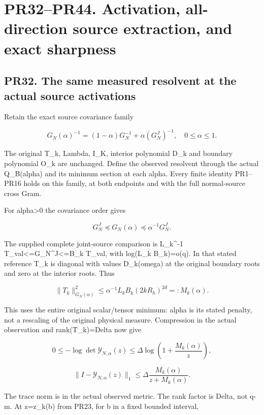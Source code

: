 \documentclass[11pt]{article}
\begin{document}
\section{PR32--PR44. Activation, all-direction source extraction, and exact sharpness}\label{pr32pr44.-activation-all-direction-source-extraction-and-exact-sharpness}

\subsection{PR32. The same measured resolvent at the actual source activations}\label{pr32.-the-same-measured-resolvent-at-the-actual-source-activations}

Retain the exact source covariance family

\[
G_N(\alpha)^{-1}=(1-\alpha)G_N^{-1}+\alpha(G_N^J)^{-1},\quad0\le\alpha\le1.
\]

The original T\_k, Lambda, I\_K, interior polynomial D\_k and boundary polynomial O\_k are unchanged. Define the observed resolvent through the actual Q\_B(alpha) and its minimum section at each alpha. Every finite identity PR1--PR16 holds on this family, at both endpoints and with the full normal-source cross Gram.

For alpha\textgreater0 the covariance order gives

\[
G_N^J\preceq G_N(\alpha)\preceq\alpha^{-1}G_N^J.
\tag{PR32}
\]

The supplied complete joint-source comparison is L\_k\^{}-1 T\_val\textless=G\_N\^{}J\textless=B\_k T\_val, with log(L\_k B\_k)=o(q). In that stated reference T\_k is diagonal with values D\_k(omega) at the original boundary roots and zero at the interior roots. Thus

\[
\|T_k\|_{G_N(\alpha)}^2
\le\alpha^{-1}L_kB_k(2kR_h)^{2d}=:M_k(\alpha).
\tag{PR33}
\]

This uses the entire original scalar/tensor minimum: alpha is its stated penalty, not a rescaling of the original physical measure. Compression in the actual observation and rank(T\_k)=Delta now give

\[
\boxed{
0\le-\log\det\mathscr Y_{N,\alpha}(z)
\le\Delta\log\left(1+\frac{M_k(\alpha)}z\right),
}
\tag{PR34}
\]

\[
\|I-\mathscr Y_{N,\alpha}(z)\|_1
\le\Delta\frac{M_k(\alpha)}{z+M_k(\alpha)}.
\]

The trace norm is in the actual observed metric. The rank factor is Delta, not q-m. At z=z\_k(b) from PR23, for b in a fixed bounded interval,
\end{document}
